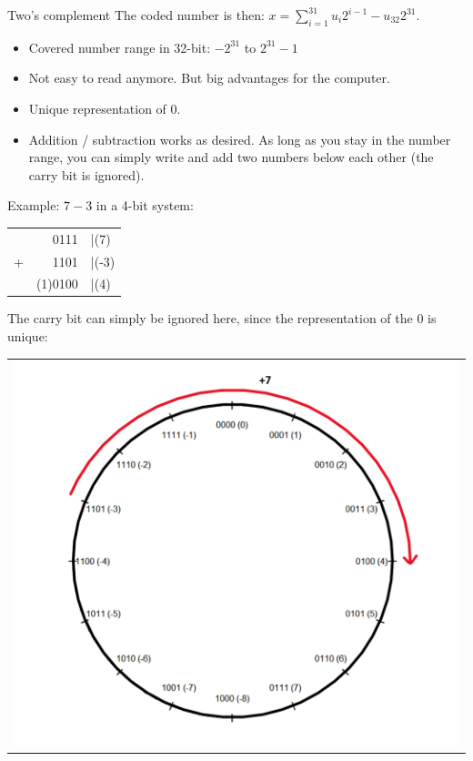 \begin{vbframe}{Two's complement}
The coded number is then: $x = \sum_{i=1}^{31} u_i 2^{i-1} - u_{32} 2^{31}$.

\framebreak
\begin{itemize}
\item Covered number range in 32-bit: $-2^{31}$ to $2^{31} - 1$
\item Not easy to read anymore. But big advantages for the computer.
\item Unique representation of $0$.
\item Addition / subtraction works as desired. As long as you stay in the number range, you can simply write and add two numbers below each other (the carry bit is ignored).
\end{itemize}
Example: $7 - 3$ in a 4-bit system:


\begin{center}
  \begin{tabular}{crl}
    &0111  &|(7)\\
    +&1101  &|(-3)\\\hline
    &(1)0100&|(4)
  \end{tabular}
\end{center}

\framebreak
The carry bit can simply be ignored here, since the representation of the $0$ is unique:

\vspace{-0.5cm}
\begin{center}
\begin{tabular}{l}
\includegraphics[width=0.4\paperwidth]{figure_man/2complement}
\end{tabular}
\end{center}


\end{vbframe}
